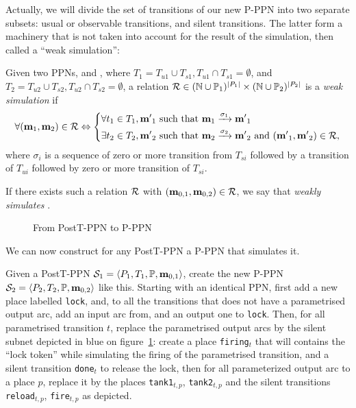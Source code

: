 Actually, we will divide the set of transitions of our new P-PPN into two separate subsets: usual or observable transitions, and silent transitions.
The latter form a machinery that is not taken into account for the result of the simulation, then called a ``weak simulation'':
\begin{defi}
  Given two \acp{PPN}, \SPTPmi and \SPTPmii,
  where $T_1 = T_{u1} \cup T_{s1}, T_{u1} \cap T_{s1} = \emptyset$,
  and   $T_2 = T_{u2} \cup T_{s2}, T_{u2} \cap T_{s2} = \emptyset$,
  a relation $\mathcal{R} \in (\mathbb{N} \cup  \mathbb{P}_1)^{|P_1|} \times (\mathbb{N} \cup  \mathbb{P}_2)^{|P_2|}$ is a \emph{weak simulation} if
  \[
    \forall (\mathbf{m}_1, \mathbf{m}_2) \in \mathcal{R} \Leftrightarrow
    \left\{
    \begin{aligned}
      &\forall t_1 \in T_1, \mathbf{m'}_1 \text{ such that } \mathbf{m}_1 \xrightarrow{\sigma_1} \mathbf{m'}_1 \\
      &\exists t_2 \in T_2, \mathbf{m'}_2 \text{ such that } \mathbf{m}_2 \xrightarrow{\sigma_2} \mathbf{m'}_2
        \text{ and } (\mathbf{m'}_1, \mathbf{m'}_2) \in \mathcal{R},
    \end{aligned}
    \right.
  \]
where $\sigma_i$ is a sequence of zero or more transition from $T_{si}$ followed by a transition of $T_{ui}$ followed by zero or more transition of $T_{si}$.

  If there exists such a relation $\mathcal{R}$ with $(\mathbf{m}_{0,1}, \mathbf{m}_{0,2}) \in \mathcal{R}$, we say that \PPNii \emph{weakly simulates} \PPNi.
\end{defi}

\begin{figure}[htbp]
  \centering
  
  \par
  \caption{From PostT-PPN to P-PPN}
  \label{fig:posttppn-to-pppn}
\end{figure}


We can now construct for any PostT-PPN a P-PPN that simulates it.

Given a PostT-PPN $\mathcal{S}_1 = \langle P_1, T_1, \mathbb{P}, \mathbf{m}_{0,1} \rangle$, create the new P-PPN $\mathcal{S}_2 = \langle P_2, T_2, \mathbb{P}, \mathbf{m}_{0,2} \rangle$ like this.
Starting with an identical \ac{PPN}, first add a new place labelled \texttt{lock}, and, to all the transitions that does not have a parametrised output arc, add an input arc from, and an output one to \texttt{lock}.
Then, for all parametrised transition $t$, replace the parametrised output arcs by the silent subnet depicted in blue on figure~\ref{fig:posttppn-to-pppn}:
create a place \texttt{firing}$_t$ that will contains the ``lock token'' while simulating the firing of the parametrised transition, and a silent transition \texttt{done}$_t$ to release the lock,
then for all parameterized output arc to a place $p$, replace it by the places \texttt{tank1}$_{t,p}$, \texttt{tank2}$_{t,p}$ and the silent transitions \texttt{reload}$_{t,p}$, \texttt{fire}$_{t,p}$ as depicted.

